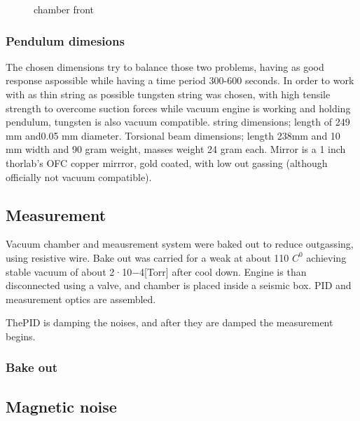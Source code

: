 \documentclass[\main/master.tex]{subfiles}
\begin{document}
\begin{figure}[htbp]
	\centering
	\caption[chamber front]{chamber front}
	\label{fig:chamber front}
\end{figure}

\subsubsection{Pendulum dimesions}
The chosen dimensions try to balance those two problems, having as good response aspossible while having a time period 300-600 seconds. In order to work with as thin string as possible tungsten string was chosen, with high tensile strength to overcome suction forces while vacuum engine is working and holding pendulum, tungsten is also vacuum compatible. string dimensions; length of 249 mm and0.05 mm diameter. Torsional beam dimensions; length 238mm and 10 mm width and 90 gram weight, masses weight 24 gram each. Mirror is a 1 inch thorlab’s OFC copper mirrror, gold coated, with low out gassing (although officially not vacuum compatible).


\subsection{Measurement}
Vacuum chamber and meausrement system were baked out to reduce outgassing, using resistive wire. Bake out was carried for a weak at about 110 $C^0$ achieving stable vacuum of about 2·10−4[Torr] after cool down. Engine is than disconnected using a valve, and chamber is placed inside a seismic box.
PID and measurement optics are assembled.

\par\noindent
ThePID is damping the noises, and after they are damped the measurement begins.








\subsubsection{Bake out}










\subsection{Magnetic noise}
\end{document}
